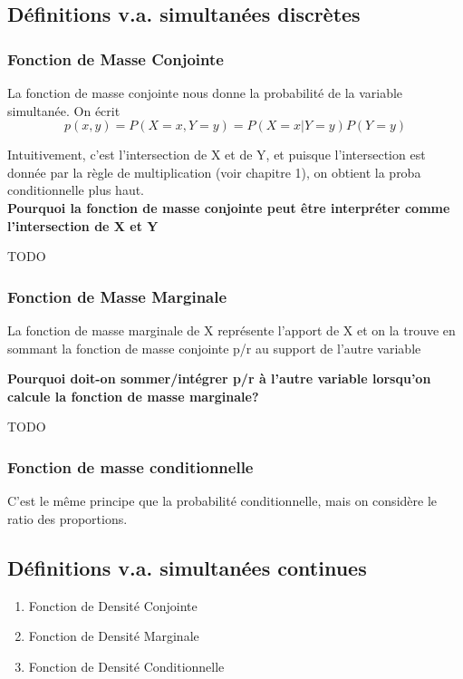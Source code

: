 \documentclass{article}
\begin{document}
\subsection{Définitions v.a. simultanées discrètes}

\subsubsection{Fonction de Masse Conjointe}%
\label{ssub:Fonction de Masse Conjointe}

La fonction de masse conjointe nous donne la probabilité de la variable
simultanée. On écrit
$$ p(x,y) = P(X=x, Y=y) = P(X=x | Y=y) P(Y=y) $$

Intuitivement, c'est l'intersection de X et de Y, et puisque l'intersection
est donnée par la règle de multiplication (voir chapitre 1), on obtient
la proba conditionnelle plus haut.\\

\textbf{Pourquoi la fonction de masse conjointe peut être interpréter comme
l'intersection de X et Y}

TODO

\subsubsection{Fonction de Masse Marginale}%
\label{ssub:Fonction de Masse Marginale}

La fonction de masse marginale de X représente l'apport de X et on la
trouve en sommant la fonction de masse conjointe p/r au support de l'autre
variable

\textbf{Pourquoi doit-on sommer/intégrer p/r à l'autre variable
lorsqu'on calcule la fonction de masse marginale?}

TODO

\subsubsection{Fonction de masse conditionnelle}%
\label{ssub:Fonction de masse conditionnelle}

C'est le même principe que la probabilité conditionnelle, mais on considère
le ratio des proportions.

\subsection{Définitions v.a. simultanées continues}

\begin{enumerate}
    \item Fonction de Densité Conjointe
    \item Fonction de Densité Marginale
    \item Fonction de Densité Conditionnelle
\end{enumerate}
\end{document}
